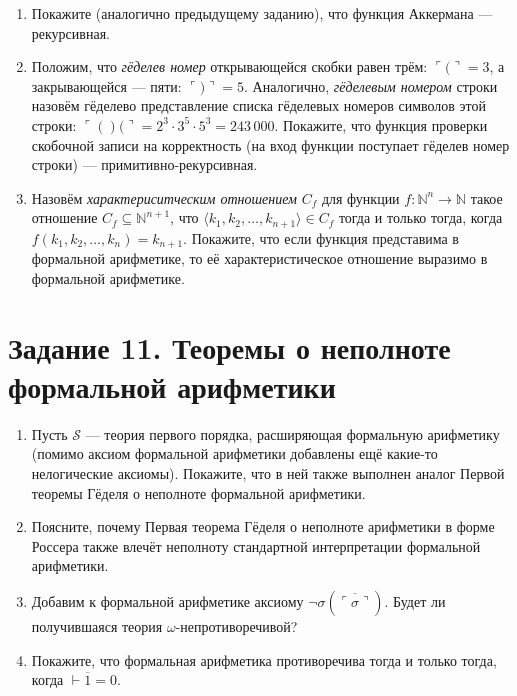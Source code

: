 \documentclass[10pt,a4paper,oneside]{article}
\begin{document}
\begin{enumerate}
\item Покажите (аналогично предыдущему заданию), что функция Аккермана --- рекурсивная.

\item Положим, что \emph{гёделев номер} открывающейся скобки равен трём: $\ulcorner ( \urcorner = 3$, а закрывающейся --- пяти: $\ulcorner ) \urcorner = 5$.
Аналогично, \emph{гёделевым номером} строки назовём гёделево представление списка гёделевых номеров символов этой строки:
$\ulcorner ()( \urcorner = 2^3 \cdot 3^5 \cdot 5^3 = 243\,000$.
Покажите, что функция проверки скобочной записи на корректность (на вход функции поступает гёделев номер строки) --- примитивно-рекурсивная.

\item Назовём \emph{характериситческим отношением} $C_f$ для функции $f: \mathbb{N}^n \rightarrow \mathbb{N}$
такое отношение $C_f\subseteq\mathbb{N}^{n+1}$, что 
$\langle k_1,k_2,\dots,k_{n+1} \rangle \in C_f$ тогда и только тогда, когда $f(k_1,k_2,\dots,k_n) = k_{n+1}$.
Покажите, что если функция представима в формальной арифметике, то её характеристическое отношение выразимо в формальной арифметике.
\end{enumerate}

\section*{Задание 11. Теоремы о неполноте формальной арифметики}
\begin{enumerate}
\item Пусть $\mathcal{S}$ --- теория первого порядка, расширяющая формальную арифметику (помимо аксиом формальной арифметики добавлены
ещё какие-то нелогические аксиомы). Покажите, что в ней также выполнен аналог Первой теоремы Гёделя о неполноте формальной арифметики.
\item Поясните, почему Первая теорема Гёделя о неполноте арифметики в форме Россера также влечёт неполноту стандартной интерпретации
формальной арифметики.
\item Добавим к формальной арифметике аксиому $\neg\sigma(\overline{\ulcorner\sigma\urcorner})$. Будет ли получившаяся теория
$\omega$-непро\-ти\-во\-ре\-чивой?
\item Покажите, что формальная арифметика противоречива тогда и только тогда, когда $\vdash \overline{1} = 0$.
\end{enumerate}
\end{document}

